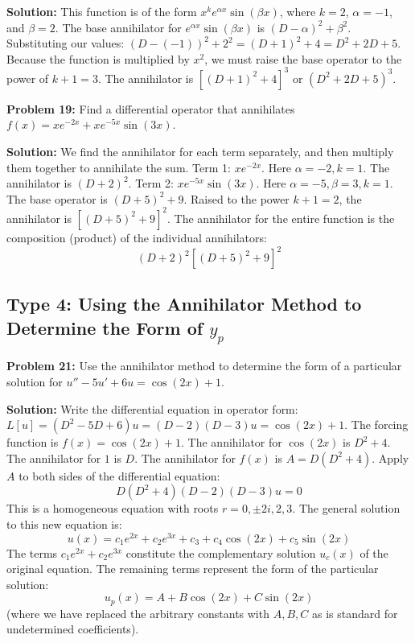 \documentclass[11pt]{article}
\begin{document}
\textbf{Solution:}
This function is of the form $x^k e^{\alpha x} \sin(\beta x)$, where $k=2$, $\alpha = -1$, and $\beta = 2$.
The base annihilator for $e^{\alpha x} \sin(\beta x)$ is $(D - \alpha)^2 + \beta^2$.
Substituting our values: $(D - (-1))^2 + 2^2 = (D + 1)^2 + 4 = D^2 + 2D + 5$.
Because the function is multiplied by $x^2$, we must raise the base operator to the power of $k+1 = 3$.
The annihilator is $[(D + 1)^2 + 4]^3$ or $(D^2 + 2D + 5)^3$.

\vspace{0.5cm}
\textbf{Problem 19:} Find a differential operator that annihilates $f(x) = x e^{-2x} + x e^{-5x} \sin(3x)$.

\textbf{Solution:}
We find the annihilator for each term separately, and then multiply them together to annihilate the sum.
Term 1: $x e^{-2x}$. Here $\alpha = -2, k = 1$. The annihilator is $(D + 2)^2$.
Term 2: $x e^{-5x} \sin(3x)$. Here $\alpha = -5, \beta = 3, k = 1$. The base operator is $(D + 5)^2 + 9$. Raised to the power $k+1 = 2$, the annihilator is $[(D + 5)^2 + 9]^2$.
The annihilator for the entire function is the composition (product) of the individual annihilators:
\[ (D + 2)^2 [(D + 5)^2 + 9]^2 \]

\subsection{Type 4: Using the Annihilator Method to Determine the Form of $y_p$}

\textbf{Problem 21:} Use the annihilator method to determine the form of a particular solution for $u'' - 5u' + 6u = \cos(2x) + 1$.

\textbf{Solution:}
Write the differential equation in operator form: $L[u] = (D^2 - 5D + 6)u = (D - 2)(D - 3)u = \cos(2x) + 1$.
The forcing function is $f(x) = \cos(2x) + 1$.
The annihilator for $\cos(2x)$ is $D^2 + 4$. The annihilator for $1$ is $D$.
The annihilator for $f(x)$ is $A = D(D^2 + 4)$.
Apply $A$ to both sides of the differential equation:
\[ D(D^2 + 4)(D - 2)(D - 3)u = 0 \]
This is a homogeneous equation with roots $r = 0, \pm 2i, 2, 3$.
The general solution to this new equation is:
\[ u(x) = c_1 e^{2x} + c_2 e^{3x} + c_3 + c_4 \cos(2x) + c_5 \sin(2x) \]
The terms $c_1 e^{2x} + c_2 e^{3x}$ constitute the complementary solution $u_c(x)$ of the original equation. The remaining terms represent the form of the particular solution:
\[ u_p(x) = A + B \cos(2x) + C \sin(2x) \]
(where we have replaced the arbitrary constants with $A, B, C$ as is standard for undetermined coefficients).
\end{document}

